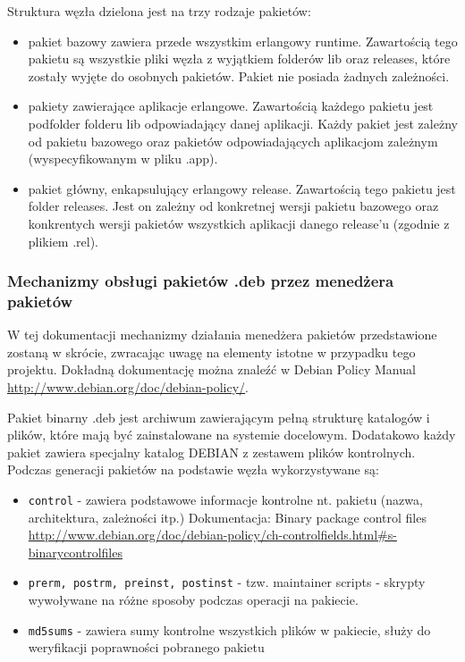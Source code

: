 \documentclass[polish,12pt]{aghthesis}
\begin{document}
Struktura węzła dzielona jest na trzy rodzaje pakietów:
\begin{itemize}
\item pakiet bazowy zawiera przede wszystkim erlangowy runtime. Zawartością tego pakietu są wszystkie pliki węzła z wyjątkiem folderów lib oraz releases, które zostały wyjęte do osobnych pakietów. Pakiet nie posiada żadnych zależności.
\item pakiety zawierające aplikacje erlangowe. Zawartością każdego pakietu jest podfolder folderu lib odpowiadający danej aplikacji. Każdy pakiet jest zależny od pakietu bazowego oraz pakietów odpowiadających aplikacjom zależnym (wyspecyfikowanym w pliku .app).
\item pakiet główny, enkapsulujący erlangowy release. Zawartością tego pakietu jest folder releases. Jest on zależny od konkretnej wersji pakietu bazowego oraz konkrentych wersji pakietów wszystkich aplikacji danego release'u (zgodnie z plikiem .rel).
\end{itemize}

\subsubsection{Mechanizmy obsługi pakietów .deb przez menedżera pakietów}
W tej dokumentacji mechanizmy działania menedżera pakietów przedstawione zostaną w skrócie, zwracając uwagę na elementy istotne w przypadku tego projektu. Dokładną dokumentację można znaleźć w  Debian Policy Manual \url{http://www.debian.org/doc/debian-policy/}.

Pakiet binarny .deb jest archiwum zawierającym pełną strukturę katalogów i plików, które mają być zainstalowane na systemie docelowym. Dodatakowo każdy pakiet zawiera specjalny katalog DEBIAN z zestawem plików kontrolnych. Podczas generacji pakietów na podstawie węzła wykorzystywane są:
\begin{itemize}
\item \texttt{control} - zawiera podstawowe informacje kontrolne nt. pakietu (nazwa, architektura, zależności itp.) Dokumentacja:  Binary package control files \url{http://www.debian.org/doc/debian-policy/ch-controlfields.html#s-binarycontrolfiles}
\item \texttt{prerm, postrm, preinst, postinst} - tzw. maintainer scripts - skrypty wywoływane na różne sposoby podczas operacji na pakiecie.
\item \texttt{md5sums} - zawiera sumy kontrolne wszystkich plików w pakiecie, służy do weryfikacji poprawności pobranego pakietu
\end{itemize}
\end{document}
